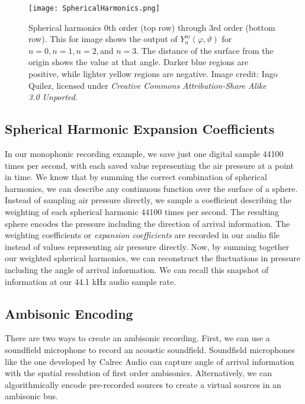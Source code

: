 \begin{figure}[h]
  \texttt{[image: SphericalHarmonics.png]}
  \caption{Spherical harmonics $0$th order (top row) through $3$rd
    order (bottom row). This for image shows the output of
    $Y_{n}^{m}(\varphi,\vartheta)$ for $n=0,n=1,n=2,$and $n=3$. The
    distance of the surface from the origin shows the value at that
    angle. Darker blue regions are positive, while lighter yellow
    regions are negative. Image credit: Ingo Quilez, licensed under
    \textit{Creative Commons Attribution-Share Alike 3.0 Unported}.}
  \label{fig:spherical-harmonics}
\end{figure}

\subsection{Spherical Harmonic Expansion Coefficients}
\label{sec:spher-harm-expans}
In our monophonic recording example, we save just one digital sample
44100 times per second, with each saved value representing the air
pressure at a point in time. We know that by summing the correct
combination of spherical harmonics, we can describe any continuous
function over the surface of a sphere. Instead of sampling air
pressure directly, we sample a coefficient describing the weighting of
each spherical harmonic 44100 times per second. The resulting sphere
encodes the pressure including the direction of arrival
information. The weighting coefficients or \textit{expansion
  coefficients} are recorded in our audio file instead of values
representing air pressure directly. Now, by summing together our
weighted spherical harmonics, we can reconstruct the fluctuations in
pressure including the angle of arrival information. We can recall
this snapshot of information at our 44.1 kHz audio sample rate.

\subsection{Ambisonic Encoding}
\label{sec:usage}
There are two ways to create an ambisonic recording. First, we can use
a soundfield microphone to record an acoustic soundfield. Soundfield
microphones like the one developed by Calrec Audio can capture angle
of arrival information with the spatial resolution of first order
ambisonics.\cite[-1in]{Ferrar1979} Alternatively, we can algorithmically
encode pre-recorded sources to create a virtual sources in an
ambisonic bus.\cite[-0.4in]{Malham1995}

